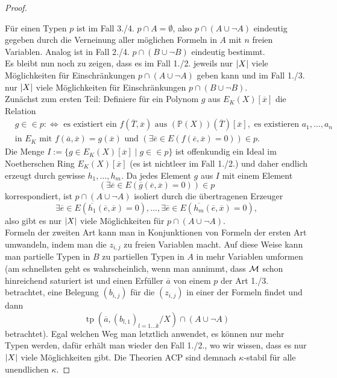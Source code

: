 \begin{proof}
\begin{enumerate}
	\end{enumerate}\newpage
	Für einen Typen $p$ ist im Fall 3./4. $p\cap A=\emptyset$, also $p\cap(A\cup\neg A)$ eindeutig gegeben durch die Verneinung aller möglichen Formeln in $A$ mit $n$ freien Variablen. Analog ist in Fall 2./4. $p\cap(B\cup\neg B)$ eindeutig bestimmt.\\
	Es bleibt nun noch zu zeigen, dass es im Fall 1./2. jeweils nur ${\left| X \right|}$ viele Möglichkeiten für Einschränkungen $p\cap(A\cup\neg A)$ geben kann und im Fall 1./3. nur ${\left| X \right|}$ viele Möglichkeiten für Einschränkungen $p\cap(B\cup\neg B)$.\\
	Zunächst zum ersten Teil: Definiere für ein Polynom $g$ aus $E_K(X)[\overline{x}]$ die Relation
	\begin{align*}&g\in\in p:\Leftrightarrow\text{ es existiert ein }f(\overline{T},\overline{x})\text{ aus }(\mathbb{P}(X))(\overline{T})[\overline{x}],\text{ es existieren }a_1,\dots,a_n\\
	&\text{in }E_K\text{ mit }f(\overline{a},\overline{x})=g(\overline{x})\text{ und }\left(\exists\overline{e}\in E(f(\overline{e},\overline{x})=0)\right)\in p.
	\end{align*}
	Die Menge $I:=\{g\in E_K(X)[\overline{x}]\mid g\in\in p\}$ ist offenkundig ein Ideal im Noetherschen Ring $E_K(X)[\overline{x}]$ (es ist nichtleer im Fall 1./2.) und daher endlich erzeugt durch gewisse $h_1,\dots,h_m$. Da jedes Element $g$ aus $I$ mit einem Element $$\left(\exists\overline{e}\in E(\overline{g}(\overline{e},\overline{x})=0)\right)\in p$$ korrespondiert, ist $p\cap(A\cup\neg A)$ isoliert durch die übertragenen Erzeuger $$\exists\overline{e}\in E(\overline{h_1}(\overline{e},\overline{x})=0),\dots,\exists\overline{e}\in E(\overline{h_m}(\overline{e},\overline{x})=0),$$ also gibt es nur ${\left| X \right|}$ viele Möglichkeiten für $p\cap(A\cup\neg A)$.\\
	Formeln der zweiten Art kann man in Konjunktionen von Formeln der ersten Art umwandeln, indem man die $z_{i,j}$ zu freien Variablen macht. Auf diese Weise kann man partielle Typen in $B$ zu partiellen Typen in $A$ in mehr Variablen umformen (am schnellsten geht es wahrscheinlich, wenn man annimmt, dass $\mathcal{M}$ schon hinreichend saturiert ist und einen Erfüller $\overline{a}$ von einem $p$ der Art 1./3. betrachtet, eine Belegung $(b_{i,j})$ für die $(z_{i,j})$ in einer der Formeln findet und dann $$\operatorname{tp}(\overline{a},(b_{l,1})_{l=1\dots k}/X)\cap(A\cup\neg A)$$ betrachtet). Egal welchen Weg man letztlich anwendet, es können nur mehr Typen werden, dafür erhält man wieder den Fall 1./2., wo wir wissen, dass es nur ${\left| X \right|}$ viele Möglichkeiten gibt. Die Theorien ACP sind demnach $\kappa$-stabil für alle unendlichen $\kappa$.
\end{proof}